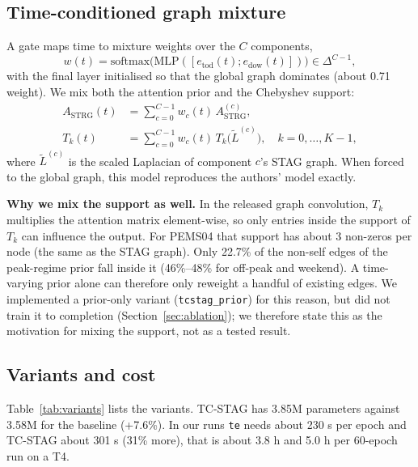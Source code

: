 \documentclass[conference]{IEEEtran}
\begin{document}
\subsection{Time-conditioned graph mixture}\label{sec:method-mix}
A gate maps time to mixture weights over the $C$ components,
\begin{equation}
w(t)=\mathrm{softmax}\bigl(\mathrm{MLP}([e_{\mathrm{tod}}(t);e_{\mathrm{dow}}(t)])\bigr)\in\Delta^{C-1},
\end{equation}
with the final layer initialised so that the global graph dominates (about 0.71 weight). We mix both the attention prior and the Chebyshev support:
\begin{align}
A_{\mathrm{STRG}}(t)&=\sum_{c=0}^{C-1}w_c(t)\,A^{(c)}_{\mathrm{STRG}},\\
T_k(t)&=\sum_{c=0}^{C-1}w_c(t)\,T_k\bigl(\tilde L^{(c)}\bigr),\quad k=0,\dots,K-1,
\end{align}
where $\tilde L^{(c)}$ is the scaled Laplacian of component $c$'s STAG graph. When forced to the global graph, this model reproduces the authors' model exactly.

\textbf{Why we mix the support as well.} In the released graph convolution, $T_k$ multiplies the attention matrix element-wise, so only entries inside the support of $T_k$ can influence the output. For PEMS04 that support has about 3 non-zeros per node (the same as the STAG graph). Only 22.7\% of the non-self edges of the peak-regime prior fall inside it (46\%--48\% for off-peak and weekend). A time-varying prior alone can therefore only reweight a handful of existing edges. We implemented a prior-only variant (\texttt{tcstag\_prior}) for this reason, but did not train it to completion (Section~\ref{sec:ablation}); we therefore state this as the motivation for mixing the support, not as a tested result.

\subsection{Variants and cost}
Table~\ref{tab:variants} lists the variants. TC-STAG has 3.85M parameters against 3.58M for the baseline (+7.6\%). In our runs \texttt{te} needs about 230 s per epoch and TC-STAG about 301 s (31\% more), that is about 3.8 h and 5.0 h per 60-epoch run on a T4.
\end{document}

